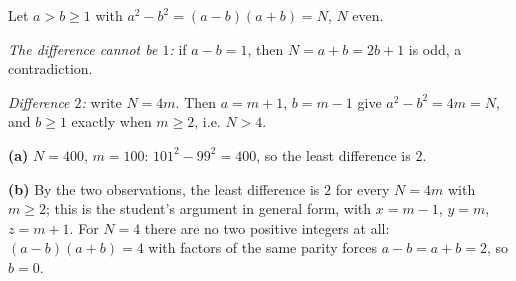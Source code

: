 Let $a>b\ge1$ with $a^2-b^2=(a-b)(a+b)=N$, $N$ even.

\emph{The difference cannot be $1$:} if $a-b=1$, then $N=a+b=2b+1$ is odd, a contradiction.

\emph{Difference $2$:} write $N=4m$. Then $a=m+1$, $b=m-1$ give $a^2-b^2=4m=N$, and $b\ge1$ exactly when $m\ge2$, i.e. $N>4$.

\textbf{(a)} $N=400$, $m=100$: $101^2-99^2=400$, so the least difference is $\boxed{2}$.

\textbf{(b)} By the two observations, the least difference is $2$ for every $N=4m$ with $m\ge2$; this is the student's argument in general form, with $x=m-1$, $y=m$, $z=m+1$. For $N=4$ there are no two positive integers at all: $(a-b)(a+b)=4$ with factors of the same parity forces $a-b=a+b=2$, so $b=0$.
